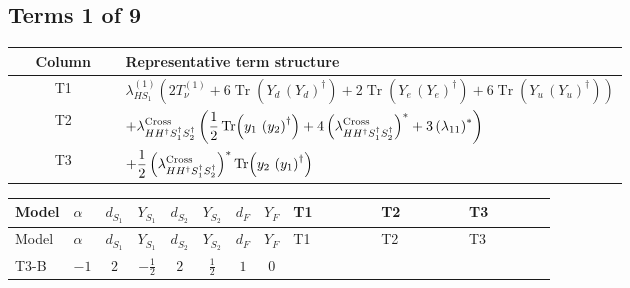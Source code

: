 \documentclass[8pt]{article}
\begin{document}
\begin{landscape}
\subsection*{Terms 1 of 9}
\begin{center}
\begin{tabular}{@{}c >{\raggedright\arraybackslash}p{0.82\linewidth}@{}}
\toprule
Column & Representative term structure \\
\midrule
T1 & \(\displaystyle {\lambda_{HS_1}^{(1)}} (2 T_{\nu}^{(1)}+6 \operatorname{Tr}\!\left({Y_d}\,\left({Y_d}\right)^{\dagger}\right)+2 \operatorname{Tr}\!\left({Y_e}\,\left({Y_e}\right)^{\dagger}\right)+6 \operatorname{Tr}\!\left({Y_u}\,\left({Y_u}\right)^{\dagger}\right))\) \\
\midrule
T2 & \(\displaystyle +{\lambda_{H H^\dagger S_1^\dagger S_2^\dagger}^{\rm Cross}} \left(\frac{1}{2} \operatorname{Tr}\!\left({y_1}\,\left({y_2}\right)^{\dagger}\right)+4 \left({\lambda_{H H^\dagger S_1^\dagger S_2^\dagger}^{\rm Cross}}\right)^{*}+3 \left({\lambda_{11}}\right)^{*}\right)\) \\
\midrule
T3 & \(\displaystyle +\frac{1}{2} \left({\lambda_{H H^\dagger S_1^\dagger S_2^\dagger}^{\rm Cross}}\right)^{*} \operatorname{Tr}\!\left({y_2}\,\left({y_1}\right)^{\dagger}\right)\) \\
\midrule
\bottomrule
\end{tabular}
\end{center}
\smallskip
\tiny
\begin{longtable}{@{}llcccccc >{\raggedright\arraybackslash}p{0.21\linewidth} >{\raggedright\arraybackslash}p{0.21\linewidth} >{\raggedright\arraybackslash}p{0.21\linewidth}@{}}
\toprule
Model & $\alpha$ & $d_{S_1}$ & $Y_{S_1}$ & $d_{S_2}$ & $Y_{S_2}$ & $d_F$ & $Y_F$ & T1 & T2 & T3 \\
\midrule
\endfirsthead
\toprule
Model & $\alpha$ & $d_{S_1}$ & $Y_{S_1}$ & $d_{S_2}$ & $Y_{S_2}$ & $d_F$ & $Y_F$ & T1 & T2 & T3 \\
\midrule
\endhead
T3-B & $-1$ & $2$ & $-\frac{1}{2}$ & $2$ & $\frac{1}{2}$ & $1$ & $0$ & \scriptsize\adjustbox{max width=\linewidth}{$\begin{gathered} {\lambda_{HS_1}^{(1)}} (2 T_{\nu}^{(1)}+6 \operatorname{Tr}\!\left({Y_d}\,\left({Y_d}\right)^{\dagger}\right)+2 \operatorname{Tr}\!\left({Y_e}\,\left({Y_e}\right)^{\dagger}\right)+6 \operatorname{Tr}\!\left({Y_u}\,\left({Y_u}\right)^{\dagger}\right))\end{gathered}$} & \scriptsize\adjustbox{max width=\linewidth}{$\begin{gathered} +{\lambda_{H H^\dagger S_1^\dagger S_2^\dagger}^{\rm Cross}} \left(\frac{1}{2} \operatorname{Tr}\!\left({y_1}\,\left({y_2}\right)^{\dagger}\right)+4 \left({\lambda_{H H^\dagger S_1^\dagger S_2^\dagger}^{\rm Cross}}\right)^{*}+3 \left({\lambda_{11}}\right)^{*}\right)\end{gathered}$} & \scriptsize\adjustbox{max width=\linewidth}{$\begin{gathered} +\frac{1}{2} \left({\lambda_{H H^\dagger S_1^\dagger S_2^\dagger}^{\rm Cross}}\right)^{*} \operatorname{Tr}\!\left({y_2}\,\left({y_1}\right)^{\dagger}\right)\end{gathered}$} \\

\end{longtable}
\end{landscape}
\end{document}
